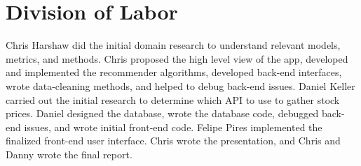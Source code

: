 \documentclass{article}
\begin{document}
\section{Division of Labor} \label{sec:division}
Chris Harshaw did the initial domain research to understand relevant models, metrics, and methods. Chris proposed the high level view of the app, developed and implemented the recommender algorithms, developed back-end interfaces, wrote data-cleaning methods, and helped to debug back-end issues.  Daniel Keller carried out the initial research to determine which API to use to gather stock prices. Daniel designed the database, wrote the database code, debugged back-end issues, and wrote initial front-end code. Felipe Pires implemented the finalized front-end user interface. Chris wrote the presentation, and Chris and Danny wrote the final report.
\end{document}
